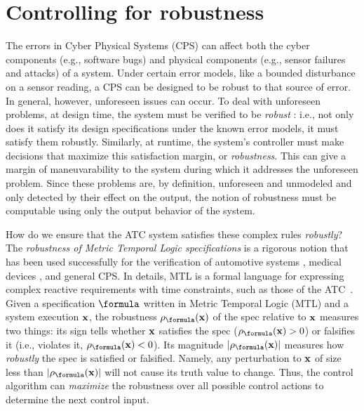 \section{Controlling for robustness}
\label{sec:intro}
The errors in Cyber Physical Systems (CPS) can affect both the cyber components (e.g., software bugs) and physical components (e.g., sensor failures and attacks) of a system. Under certain error models, like a bounded disturbance on a sensor reading, a CPS can be designed to be robust to that source of error.
In general, however, unforeseen issues can occur. 
To deal with unforeseen problems, at design time, the system must be verified to be \textit{robust} : i.e., not only does it satisfy its design specifications under the known error models, it must satisfy them robustly.
Similarly, at runtime, the system's controller must make decisions that maximize this satisfaction margin, or \textit{robustness}.
This can give a margin of maneuvarability to the system during which it addresses the unforeseen problem.
Since these problems are, by definition, unforeseen and unmodeled and only detected by their effect on the output, the notion of robustness must be computable using only the output behavior of the system.



How do we ensure that the ATC system satisfies these complex rules \textit{robustly}?
The \textit{robustness of Metric Temporal Logic specifications} \cite{Fainekos2006_TLVerifSimu,Donze2010} is a rigorous notion that has been used successfully for the verification of automotive systems \cite{Fainekos12_Automotive,Dreossi15_RRTFalsification}, medical devices \cite{SankaranarayananF2012cmsb}, and general CPS.
In details, MTL is a formal language for expressing complex reactive requirements with time constraints, such as those of the ATC~\cite{Koymans90}.
Given a specification $\formula$ written in Metric Temporal Logic (MTL) and a system execution $\mathbf{x}$, the robustness $\robf(\sstraj)$ of the spec relative to $\mathbf{x}$ measures two things:
its sign tells whether $\mathbf{x}$ satisfies the spec ($\robf(\sstraj) > 0$) or falsifies it (i.e., violates it, $\robf(\sstraj) <0$).
Its magnitude $|\robf(\sstraj)|$ measures how \textit{robustly} the spec is satisfied or falsified.
Namely, any perturbation to $\mathbf{x}$ of size less than $|\robf(\sstraj)|$ will not cause its truth value to change.
Thus, the control algorithm can \textit{maximize} the robustness over all possible control actions to determine the next control input.

